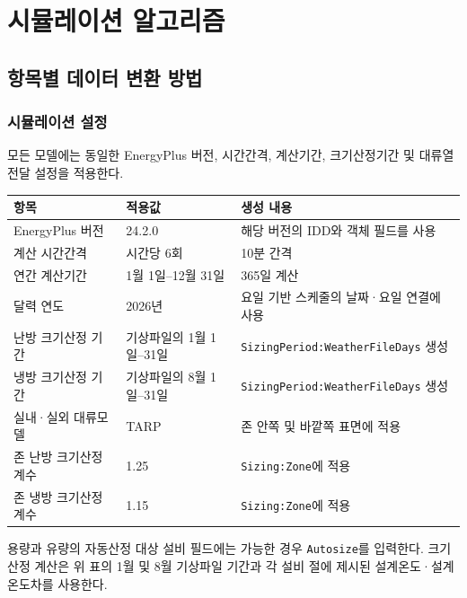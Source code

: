 
\part{시뮬레이션 알고리즘}
\label{part:algorithm}

\chapter{항목별 데이터 변환 방법}
\label{chap:simulator_geometry}

\section{시뮬레이션 설정}
\label{section:global-model-assumptions}

모든 모델에는 동일한 EnergyPlus 버전, 시간간격, 계산기간, 크기산정기간 및 대류열전달 설정을 적용한다.

\begin{defaulttable}
  \caption{모든 모델에 공통으로 적용되는 EnergyPlus 계산 설정}
  \label{tab:global-energyplus-settings}
  \small
  \begin{tabularx}{\textwidth}{p{4cm}p{4.1cm}X}
    \toprule
    항목 & 적용값 & 생성 내용 \\ \midrule
    EnergyPlus 버전 & 24.2.0 & 해당 버전의 IDD와 객체 필드를 사용 \\
    계산 시간간격 & 시간당 6회 & 10분 간격 \\
    연간 계산기간 & 1월 1일--12월 31일 & 365일 계산 \\
    달력 연도 & 2026년 & 요일 기반 스케줄의 날짜·요일 연결에 사용 \\
    난방 크기산정 기간 & 기상파일의 1월 1일--31일 & \texttt{SizingPeriod:WeatherFileDays} 생성 \\
    냉방 크기산정 기간 & 기상파일의 8월 1일--31일 & \texttt{SizingPeriod:WeatherFileDays} 생성 \\
    실내·실외 대류모델 & TARP & 존 안쪽 및 바깥쪽 표면에 적용 \\
    존 난방 크기산정 계수 & 1.25 & \texttt{Sizing:Zone}에 적용 \\
    존 냉방 크기산정 계수 & 1.15 & \texttt{Sizing:Zone}에 적용 \\ \bottomrule
  \end{tabularx}
\end{defaulttable}

용량과 유량의 자동산정 대상 설비 필드에는 가능한 경우 \texttt{Autosize}를 입력한다. 크기산정 계산은 위 표의 1월 및 8월 기상파일 기간과 각 설비 절에 제시된 설계온도·설계온도차를 사용한다.


